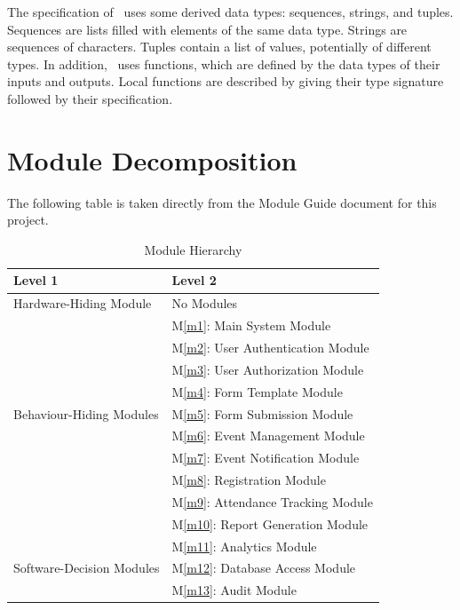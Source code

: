 \documentclass[12pt, titlepage]{article}
\begin{document}
\noindent
The specification of \progname \ uses some derived data types: sequences, strings, and
tuples. Sequences are lists filled with elements of the same data type. Strings
are sequences of characters. Tuples contain a list of values, potentially of
different types. In addition, \progname \ uses functions, which
are defined by the data types of their inputs and outputs. Local functions are
described by giving their type signature followed by their specification.

\section{Module Decomposition}

The following table is taken directly from the Module Guide document for this project.

\begin{table}[H]
\centering
\begin{tabular}{p{} p{}}
\toprule
\textbf{Level 1} & \textbf{Level 2}\\
\midrule

Hardware-Hiding Module
& No Modules\\
\midrule

\multirow{9}{0.3\textwidth}{Behaviour-Hiding Modules}
& M\ref{m1}: Main System Module\\
& M\ref{m2}: User Authentication Module\\
& M\ref{m3}: User Authorization Module\\
& M\ref{m4}: Form Template Module\\
& M\ref{m5}: Form Submission Module\\
& M\ref{m6}: Event Management Module\\
& M\ref{m7}: Event Notification Module\\
& M\ref{m8}: Registration Module\\
& M\ref{m9}: Attendance Tracking Module\\
& M\ref{m10}: Report Generation Module\\
\midrule

\multirow{3}{0.3\textwidth}{Software-Decision Modules}
& M\ref{m11}: Analytics Module\\
& M\ref{m12}: Database Access Module\\
& M\ref{m13}: Audit Module\\
\bottomrule

\end{tabular}
\caption{Module Hierarchy}
\label{TblMH}
\end{table}
\end{document}
